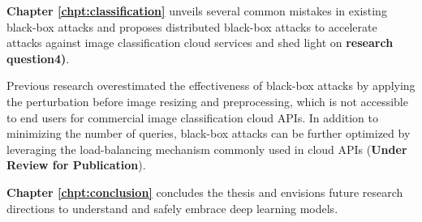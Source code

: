 \vspace{0.5cm}

\noindent \textbf{Chapter \ref{chpt:classification}} unveils several common mistakes in existing black-box attacks and proposes distributed black-box attacks to accelerate attacks against image classification cloud services and shed light on \textbf{research question4)}. 

Previous research overestimated the effectiveness of black-box attacks by applying the perturbation before image resizing and preprocessing, which is not accessible to end users for commercial image classification cloud APIs. In addition to minimizing the number of queries, black-box attacks can be further optimized by leveraging the load-balancing mechanism commonly used in cloud APIs (\textbf{Under Review for Publication}).

\vspace{0.5cm}

\noindent \textbf{Chapter \ref{chpt:conclusion}} concludes the thesis and envisions future research directions to understand and safely embrace deep learning models. 

